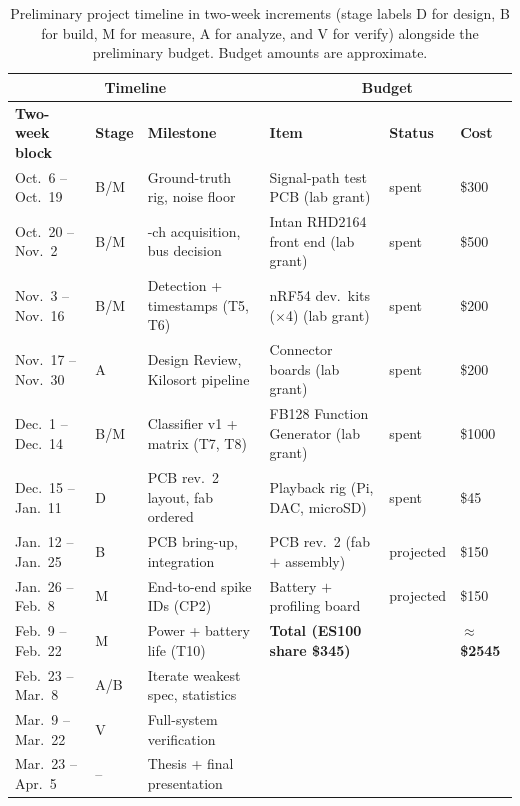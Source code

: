\documentclass[11pt]{article}
\begin{document}
\begin{table}[H]
\centering
\caption{Preliminary project timeline in two-week increments (stage labels D for design,
B for build, M for measure, A for analyze, and V for verify) alongside the preliminary budget.
Budget amounts are approximate.}
\label{tab:timeline}
{\footnotesize\sffamily
\setlength{\tabcolsep}{4pt}
\renewcommand{\arraystretch}{1.2}
\begin{tabular}{|l|l|>{\raggedright\arraybackslash}p{148pt}|>{\raggedright\arraybackslash}p{86pt}|l|l|}
\hline
\multicolumn{3}{|c|}{\textbf{Timeline}} & \multicolumn{3}{c|}{\textbf{Budget}} \\
\hline
\textbf{Two-week block} & \textbf{Stage} & \textbf{Milestone} & \textbf{Item} & \textbf{Status} & \textbf{Cost} \\
\hline
Oct.\ 6 -- Oct.\ 19   & B/M & Ground-truth rig, noise floor      & Signal-path test PCB (lab grant)& spent & \$300 \\
\hline
Oct.\ 20 -- Nov.\ 2   & B/M & 32-ch acquisition, bus decision    & Intan RHD2164 front end (lab grant)& spent & \$500 \\
\hline
Nov.\ 3 -- Nov.\ 16   & B/M & Detection + timestamps (T5, T6)    & nRF54 dev.\ kits ($\times$4) (lab grant) & spent & \$200 \\
\hline
Nov.\ 17 -- Nov.\ 30  & A   & Design Review, Kilosort pipeline   & Connector boards (lab grant) & spent & \$200 \\
\hline
Dec.\ 1 -- Dec.\ 14   & B/M & Classifier v1 + matrix (T7, T8)    & FB128 Function Generator (lab grant) & spent & \$1000 \\
\hline
Dec.\ 15 -- Jan.\ 11  & D   & PCB rev.\ 2 layout, fab ordered    & Playback rig (Pi, DAC, microSD) & spent & \$45 \\
\hline
Jan.\ 12 -- Jan.\ 25  & B   & PCB bring-up, integration          & PCB rev.\ 2 (fab $+$ assembly) & projected & \$150 \\
\hline
Jan.\ 26 -- Feb.\ 8   & M   & End-to-end spike IDs (CP2)         & Battery $+$ profiling board & projected & \$150 \\
\hline
Feb.\ 9 -- Feb.\ 22   & M   & Power + battery life (T10)         & \textbf{Total (ES100 share \$345)} & & \textbf{$\approx$\$2545} \\
\hline
Feb.\ 23 -- Mar.\ 8   & A/B & Iterate weakest spec, statistics   & \cellcolor[gray]{0.82} & \cellcolor[gray]{0.82} & \cellcolor[gray]{0.82} \\
\hline
Mar.\ 9 -- Mar.\ 22   & V   & Full-system verification           & \cellcolor[gray]{0.82} & \cellcolor[gray]{0.82} & \cellcolor[gray]{0.82} \\
\hline
Mar.\ 23 -- Apr.\ 5   & --  & Thesis + final presentation        & \cellcolor[gray]{0.82} & \cellcolor[gray]{0.82} & \cellcolor[gray]{0.82} \\
\hline
\end{tabular}
}
\end{table}
\end{document}
